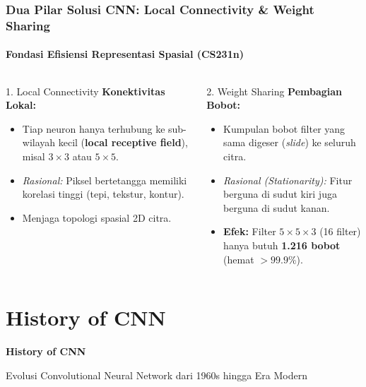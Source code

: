 \documentclass[t,aspectratio=169,xcolor=dvipsnames]{beamer}
\begin{document}
\begin{frame}
    \frametitle{Dua Pilar Solusi CNN: Local Connectivity \& Weight Sharing}
    \framesubtitle{Fondasi Efisiensi Representasi Spasial (CS231n)}
    \footnotesize

    \begin{columns}[t]
        \begin{block}{1. Local Connectivity}
            \textbf{Konektivitas Lokal:}
            \begin{itemize}
                \item Tiap neuron hanya terhubung ke sub-wilayah kecil (\textbf{local receptive field}), misal $3\times3$ atau $5\times5$.
                \item \textit{Rasional:} Piksel bertetangga memiliki korelasi tinggi (tepi, tekstur, kontur).
                \item Menjaga topologi spasial 2D citra.
            \end{itemize}
        \end{block}

        \begin{exampleblock}{2. Weight Sharing}
            \textbf{Pembagian Bobot:}
            \begin{itemize}
                \item Kumpulan bobot filter yang sama digeser (\textit{slide}) ke seluruh citra.
                \item \textit{Rasional (Stationarity):} Fitur berguna di sudut kiri juga berguna di sudut kanan.
                \item \textbf{Efek:} Filter $5\times5\times3$ (16 filter) hanya butuh \textbf{1.216 bobot} (hemat $>99.9\%$).
            \end{itemize}
        \end{exampleblock}
    \end{columns}

\end{frame}

\section{History of CNN}

\begin{frame}[plain]
    \begin{center}
        \vspace{3cm}
        {\Huge \textbf{History of CNN}}
        \vspace{0.5cm}
        
        {\large Evolusi Convolutional Neural Network dari 1960s hingga Era Modern}
    \end{center}
\end{frame}
\end{document}
